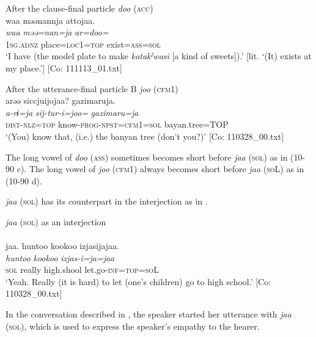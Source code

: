   \ex After the clause-final particle \textit{doo} (\textsc{acc})\\
      \glll    waa  məənannja  attojaa.\\
    \textit{waa}  \textit{məə=nan=ja}  \textit{ar=doo=}\\
    1\textsc{sg}.\textsc{adnz}  place=\textsc{loc}1=\textsc{top}  exist=\textsc{ass}=\textsc{sol}\\
    \glt     ‘I have (the model plate to make \textit{katakˀwasi} [a kind of sweets]).’ [lit. ‘(It) exists at my place.’]  [Co: 111113\_01.txt]

   \ex After the utterance-final particle B \textit{joo} (\textsc{cfm}1)\\
      \glll    arəə  siccjuijojaa?  gazimaruja.\\
    \textit{a-rɨ=ja}  \textit{sij-tur-i=joo=}  \textit{gazimaru=ja}\\
    \textsc{dist}-\textsc{nlz}=\textsc{top}  know-\textsc{prog}-\textsc{npst}=\textsc{cfm}1=\textsc{sol}  bayan.tree=TOP\\
 \glt     ‘(You) know that, (i.e.) the banyan tree (don’t you?)’  [Co: 110328\_00.txt]
 \z
\z

The long vowel of \textit{doo} (\textsc{ass}) sometimes becomes short before \textit{jaa} (\textsc{sol}) as in (10-90 c). The long vowel of \textit{joo} (\textsc{cfm}1) always becomes short before \textit{jaa} (\textsc{so}L) as in (10-90 d).

  \textit{jaa} (\textsc{sol}) has its counterpart in the interjection as in .

\ea\label{ex:10.91}   \textit{jaa} (\textsc{sol}) as an interjection\\\\
      \glll    jaa.  huntoo  {\textbar}kookoo{\textbar}  izjasijajaa.\\
    \textit{}  \textit{huntoo}  \textit{kookoo}  \textit{izjas-i=ja=jaa}\\
    \textsc{sol}  really  high.shool  let.go-\textsc{inf}=\textsc{top}=\textsc{so}L\\
\glt     ‘Yeah. Really (it is hard) to let (one’s children) go to high school.’  [Co: 110328\_00.txt]
\z

In the conversation described in , the speaker started her utterance with \textit{jaa} (\textsc{sol}), which is used to express the speaker’s empathy to the hearer.

